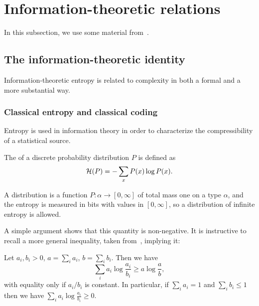 \section{Information-theoretic relations} 

In this subsection, we use some material
from~\cite{GacsTrompVitAlgorStat00}.

\subsection{The information-theoretic identity}

Information-theoretic entropy is related to complexity in both a formal and a
more substantial way.

\subsubsection{Classical entropy and classical coding}

Entropy is used in information theory in order to characterize the
compressibility of a statistical source.

 \begin{definition}
  \label{def:g3.1.1}
  \leanok
The  of a discrete probability distribution \( P \) is defined as
 \[
   \mathcal{H}(P) = -\sum_{x} P(x)\log P(x).
 \]
 \end{definition}

\begin{formalization}
A distribution is a function \( P \colon \alpha \to [0, \infty] \) of total mass one on a
type \( \alpha \), and the entropy is measured in bits with values in \( [0, \infty] \), so a
distribution of infinite entropy is allowed.
\end{formalization}

A simple argument shows that this quantity is non-negative.
It is instructive to recall a more general inequality, taken
from~\cite{CsiszarKornerBook81}, implying it:

 \begin{theorem}\label{thm:CsiszarConc}
  \leanok
Let \( a_{i}, b_{i} > 0 \), \( a = \sum_{i} a_{i} \), \( b = \sum_{i} b_{i} \).
Then we have
 \begin{equation}\label{eq:CsiszarConc}
  \sum_{i} a_{i} \log \frac{a_{i}}{b_{i}} \ge a \log \frac{a}{b},
 \end{equation}
with equality only if \( a_{i}/b_{i} \) is constant.
In particular, if \( \sum_{i}a_{i}=1 \) and \( \sum_{i}b_{i}\le 1 \) then we have
\( \sum_{i} a_{i} \log \frac{a_{i}}{b_{i}}\ge 0 \).
 \end{theorem}

